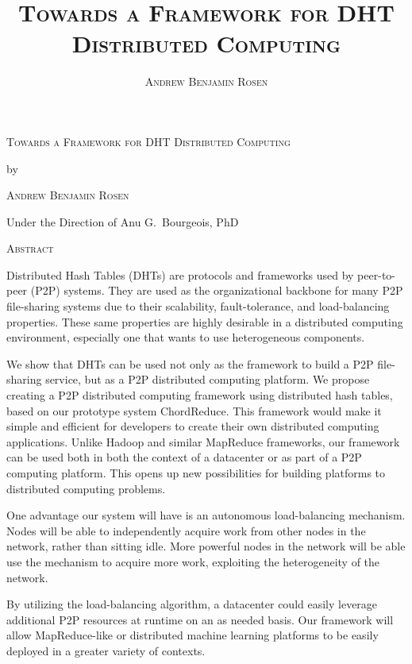 \documentclass[11pt,letterpaper]{report}
\title{\textsc{Towards a Framework for DHT Distributed Computing}}
\author{\textsc{Andrew Benjamin Rosen}}
\date{}
\begin{document}
	
	

	\pagestyle{empty}

	\begin{center}
		{\scshape Towards a Framework for DHT Distributed Computing\par}
		\vspace{0.5cm}
		{by\par}
		\vspace{0.5cm}
		{\scshape Andrew Benjamin Rosen\par}
		\vspace{0.5cm}
		{Under the Direction of Anu G.~Bourgeois, PhD \par}
		\vspace{0.5cm}
		{\scshape Abstract \par}
		
	\end{center}
	
	
		Distributed Hash Tables (DHTs) are protocols and frameworks used by peer-to-peer (P2P) systems.
		They are used as the organizational backbone for many P2P file-sharing systems due to their scalability, fault-tolerance, and load-balancing properties.
		These same properties are highly desirable in a distributed computing environment, especially one that wants to use heterogeneous components.
		
		We show that DHTs can be used not only as the framework to build a P2P file-sharing service, but as a P2P distributed computing platform.
		We propose creating a P2P distributed computing framework using distributed hash tables, based on our prototype system ChordReduce.
		This framework would make it simple and efficient for developers to create their own distributed computing applications.
		Unlike Hadoop and similar MapReduce frameworks, our framework can be used both in both the context of a datacenter or as part of a P2P computing platform.  
		This opens up new possibilities for building platforms to distributed computing problems.
		
		One advantage our system will have is an autonomous load-balancing mechanism.
		Nodes will be able to independently acquire work from other nodes in the network, rather than sitting idle.
		More powerful nodes in the network will be able use the mechanism to acquire more work, exploiting the heterogeneity of the network.
		
		By utilizing the load-balancing algorithm, a datacenter could easily leverage additional P2P resources at runtime on an as needed basis.
		Our framework will allow MapReduce-like or distributed machine learning platforms to be easily deployed in a greater variety of contexts.
		
\end{document}
